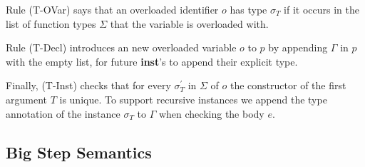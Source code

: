 \documentclass[runningheads]{llncs}
\begin{document}
Rule (T-OVar) says that an overloaded identifier $o$ has type $\sigma_T$ if it occurs in the list of function types $\Sigma$ that the variable is overloaded with. 

Rule (T-Decl) introduces an new overloaded variable $o$ to $p$ by appending $\Gamma$ in $p$ with the empty list, for future \textbf{inst}'s to append their explicit type.

Finally, (T-Inst) checks that for every $\sigma_T^\prime$ in $\Sigma$ of $o$ the constructor of the first argument $T$ is unique. To support recursive instances we append the type annotation of the instance $\sigma_T$ to $\Gamma$ when checking the body $e$. %
\subsection{Big Step Semantics}
\label{semantics}
\end{document}

